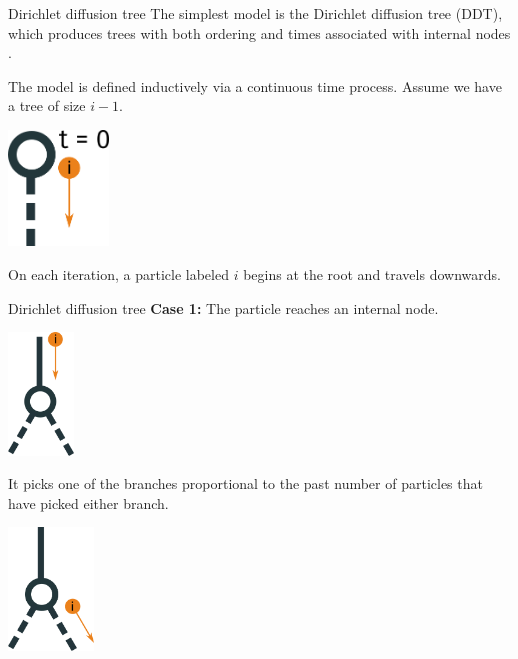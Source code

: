 \documentclass[10pt, compress]{beamer}
\begin{document}
\begin{frame}{Dirichlet diffusion tree}
    The simplest model is the Dirichlet diffusion tree (DDT),
    which produces trees with both ordering
    and times associated with internal nodes \cite{Neal2003}.

    The model is defined inductively via a continuous time
    process. Assume we have a tree of size $i - 1$.

    \pause

    \begin{center}
      \includegraphics[width=0.2\textwidth]{img/ddt-1}
    \end{center}

    On each iteration, a particle labeled $i$ begins at the root and travels downwards.
\end{frame}

\begin{frame}{Dirichlet diffusion tree}
  \textbf{Case 1:} 
  The particle reaches an internal node.
  \begin{center}
      \includegraphics[width=0.13\textwidth]{img/ddt-2}
  \end{center}

  \pause

  It picks one of the branches proportional to the past number
  of particles that have picked either branch.

  \pause

  \begin{center}
      \includegraphics[width=0.17\textwidth]{img/ddt-3}
  \end{center}
\end{frame}
\end{document}
